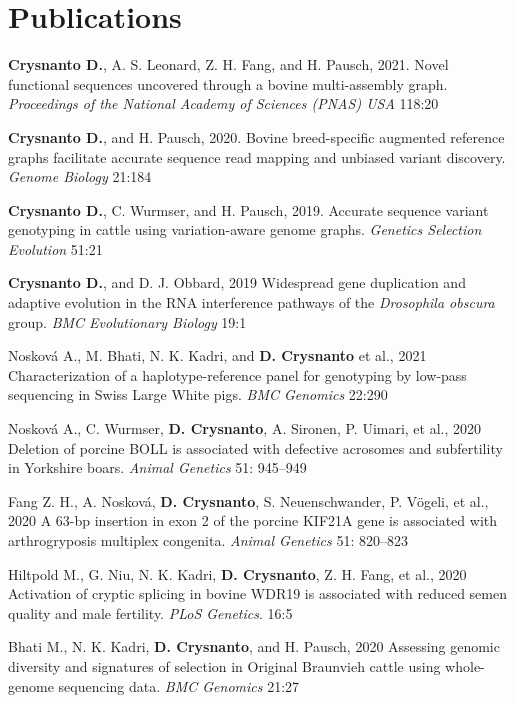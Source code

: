 \documentclass[letterpaper,10pt]{article}
\begin{document}
\section{Publications}
 \begin{enumerate}[leftmargin=0.3in]
    \small{\item{\textbf{Crysnanto D.}, A. S. Leonard, Z. H. Fang, and H. Pausch, 2021. Novel functional sequences uncovered through a bovine multi-assembly graph. \textit{Proceedings of the National Academy of Sciences (PNAS) USA} 118:20}
    \item{\textbf{Crysnanto D.}, and H. Pausch, 2020. Bovine breed-specific augmented reference graphs facilitate accurate sequence read mapping and unbiased variant discovery. \textit{Genome Biology} 21:184}
    \item{\textbf{Crysnanto D.}, C. Wurmser, and H. Pausch, 2019. Accurate sequence variant genotyping in cattle using variation-aware genome graphs. \textit{Genetics Selection Evolution} 51:21 }
    \item{\textbf{Crysnanto D.}, and D. J. Obbard, 2019 Widespread gene duplication and adaptive evolution in the RNA interference pathways of the \emph{Drosophila obscura} group. \textit{BMC Evolutionary Biology} 19:1}
    \item{Nosková A., M. Bhati, N. K. Kadri, and \textbf{D. Crysnanto} et al., 2021 Characterization of a haplotype-reference panel for genotyping by low-pass sequencing in Swiss Large White pigs. \emph{BMC Genomics} 22:290}
      
    \item{Nosková A., C. Wurmser, \textbf{D. Crysnanto}, A. Sironen, P. Uimari, et al., 2020 Deletion of porcine BOLL is associated with defective acrosomes and subfertility in Yorkshire boars. \textit{Animal Genetics} 51: 945–949}
    
    \item{Fang Z. H., A. Nosková, \textbf{D. Crysnanto}, S. Neuenschwander, P. Vögeli, et al., 2020 A 63-bp insertion in exon 2 of the porcine KIF21A gene is associated with arthrogryposis multiplex congenita. \textit{Animal Genetics} 51: 820–823}
    
    \item{Hiltpold M., G. Niu, N. K. Kadri, \textbf{D. Crysnanto}, Z. H. Fang, et al., 2020 Activation of cryptic splicing in bovine WDR19 is associated with reduced semen quality and male fertility. \textit{PLoS Genetics}. 16:5}
    
    \item{Bhati M., N. K. Kadri, \textbf{D. Crysnanto}, and H. Pausch, 2020 Assessing genomic diversity and signatures of selection in Original Braunvieh cattle using whole-genome sequencing data. \emph{BMC Genomics} 21:27} 
}
 \end{enumerate}
\end{document}

